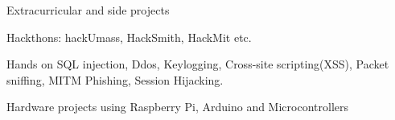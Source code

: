 \begin{cventries}
  \cventry
    {Extracurricular and side projects}
    {}
    {}
    {}
    {
      \begin{cvitems}
        \item {Hackthons: hackUmass, HackSmith, HackMit etc.}
        \item {Hands on SQL injection, Ddos, Keylogging, Cross-site scripting(XSS), Packet sniffing, MITM Phishing, Session Hijacking.}
        \item {Hardware projects using Raspberry Pi, Arduino and Microcontrollers}
      \end{cvitems}
    }
\end{cventries}
